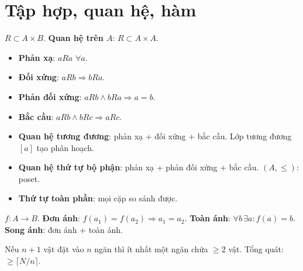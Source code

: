 \documentclass[12pt,a4paper]{article}
\begin{document}
\section{Tập hợp, quan hệ, hàm}

\begin{dinhnghia}[title={Quan hệ}]
  $R \subset A \times B$. \textbf{Quan hệ trên $A$}: $R \subset A \times A$.
  \begin{itemize}
    \item \textbf{Phản xạ}: $aRa$ $\forall a$.
    \item \textbf{Đối xứng}: $aRb \Rightarrow bRa$.
    \item \textbf{Phản đối xứng}: $aRb \wedge bRa \Rightarrow a = b$.
    \item \textbf{Bắc cầu}: $aRb \wedge bRc \Rightarrow aRc$.
  \end{itemize}
\end{dinhnghia}

\begin{dinhnghia}[title={Quan hệ tương đương và quan hệ thứ tự}]
  \begin{itemize}
    \item \textbf{Quan hệ tương đương}: phản xạ + đối xứng + bắc cầu. Lớp tương đương $[a]$ tạo phân hoạch.
    \item \textbf{Quan hệ thứ tự bộ phận}: phản xạ + phản đối xứng + bắc cầu. $(A, \le)$: poset.
    \item \textbf{Thứ tự toàn phần}: mọi cặp so sánh được.
  \end{itemize}
\end{dinhnghia}

\begin{dinhnghia}[title={Hàm}]
  $f: A \to B$. \textbf{Đơn ánh}: $f(a_1) = f(a_2) \Rightarrow a_1 = a_2$. \textbf{Toàn ánh}: $\forall b\, \exists a: f(a) = b$. \textbf{Song ánh}: đơn ánh + toàn ánh.
\end{dinhnghia}

\begin{dinhly}[title={Nguyên lý Dirichlet (ngăn kéo)}]
  Nếu $n+1$ vật đặt vào $n$ ngăn thì ít nhất một ngăn chứa $\ge 2$ vật. Tổng quát: $\ge \lceil N/n \rceil$.
\end{dinhly}

\end{document}
